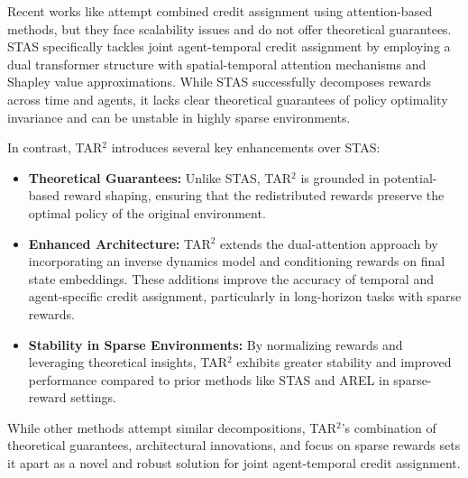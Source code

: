 Recent works like \citet{she2022agent} attempt combined credit assignment using attention-based methods, but they face scalability issues and do not offer theoretical guarantees. STAS \citep{Chen2023STASSR} specifically tackles joint agent-temporal credit assignment by employing a dual transformer structure with spatial-temporal attention mechanisms and Shapley value approximations. While STAS successfully decomposes rewards across time and agents, it lacks clear theoretical guarantees of policy optimality invariance and can be unstable in highly sparse environments.

In contrast, TAR\(^{2}\) introduces several key enhancements over STAS:
\begin{itemize}
    \item \textbf{Theoretical Guarantees:} Unlike STAS, TAR\(^{2}\) is grounded in potential-based reward shaping, ensuring that the redistributed rewards preserve the optimal policy of the original environment.
    \item \textbf{Enhanced Architecture:} TAR\(^{2}\) extends the dual-attention approach by incorporating an inverse dynamics model and conditioning rewards on final state embeddings. These additions improve the accuracy of temporal and agent-specific credit assignment, particularly in long-horizon tasks with sparse rewards.
    \item \textbf{Stability in Sparse Environments:} By normalizing rewards and leveraging theoretical insights, TAR\(^{2}\) exhibits greater stability and improved performance compared to prior methods like STAS and AREL in sparse-reward settings.
\end{itemize}

While other methods attempt similar decompositions, TAR\(^{2}\)’s combination of theoretical guarantees, architectural innovations, and focus on sparse rewards sets it apart as a novel and robust solution for joint agent-temporal credit assignment.